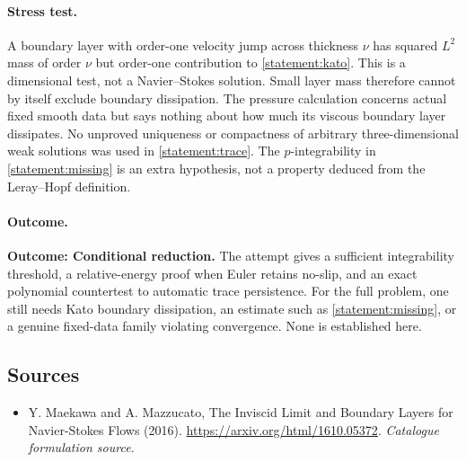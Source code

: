 \documentclass[11pt,a4paper]{article}
\numberwithin{equation}{section}
\begin{document}
\paragraph{Stress test.}
A boundary layer with order-one velocity jump across thickness $\nu$ has
squared $L^2$ mass of order $\nu$ but order-one contribution to
\eqref{statement:kato}. This is a dimensional test, not a Navier--Stokes solution.
Small layer mass therefore cannot by itself exclude boundary dissipation.
The pressure calculation concerns actual fixed smooth data but says nothing
about how much its viscous boundary layer dissipates. No unproved uniqueness
or compactness of arbitrary three-dimensional weak solutions was used in
\eqref{statement:trace}. The $p$-integrability in \eqref{statement:missing} is an extra
hypothesis, not a property deduced from the Leray--Hopf definition.

\paragraph{Outcome.}
\textbf{Outcome: Conditional reduction.}
The attempt gives a sufficient integrability threshold, a relative-energy
proof when Euler retains no-slip, and an exact polynomial countertest to
automatic trace persistence. For the full problem, one still needs Kato
boundary dissipation, an estimate such as \eqref{statement:missing}, or a genuine
fixed-data family violating convergence. None is established here.

\subsection{Sources}
\begin{itemize}\raggedright
\item[\textnormal{[S1]}]\hypertarget{source:statement:1}{} Y. Maekawa and A. Mazzucato, The Inviscid Limit and Boundary Layers for Navier-Stokes Flows (2016).
\url{https://arxiv.org/html/1610.05372}.
{\small\textit{Catalogue formulation source.}}

\end{itemize}
\end{document}
